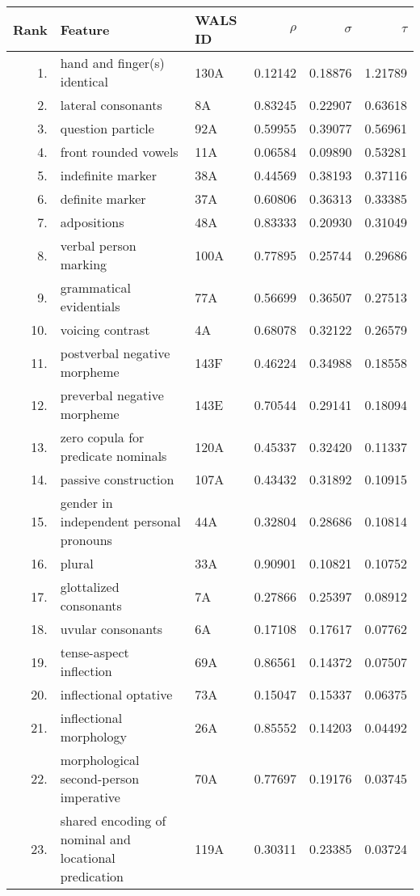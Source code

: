 \begin{tabular}{rllrrr}
Rank & Feature & WALS ID & $\rho$ & $\sigma$ & $\tau$ \\
\hline
1. & hand and finger(s) identical & 130A & 0.12142 & 0.18876 & 1.21789 \\
2. & lateral consonants & 8A & 0.83245 & 0.22907 & 0.63618 \\
3. & question particle & 92A & 0.59955 & 0.39077 & 0.56961 \\
4. & front rounded vowels & 11A & 0.06584 & 0.09890 & 0.53281 \\
5. & indefinite marker & 38A & 0.44569 & 0.38193 & 0.37116 \\
6. & definite marker & 37A & 0.60806 & 0.36313 & 0.33385 \\
7. & adpositions & 48A & 0.83333 & 0.20930 & 0.31049 \\
8. & verbal person marking & 100A & 0.77895 & 0.25744 & 0.29686 \\
9. & grammatical evidentials & 77A & 0.56699 & 0.36507 & 0.27513 \\
10. & voicing contrast & 4A & 0.68078 & 0.32122 & 0.26579 \\
11. & postverbal negative morpheme & 143F & 0.46224 & 0.34988 & 0.18558 \\
12. & preverbal negative morpheme & 143E & 0.70544 & 0.29141 & 0.18094 \\
13. & zero copula for predicate nominals & 120A & 0.45337 & 0.32420 & 0.11337 \\
14. & passive construction & 107A & 0.43432 & 0.31892 & 0.10915 \\
15. & gender in independent personal pronouns & 44A & 0.32804 & 0.28686 & 0.10814 \\
16. & plural & 33A & 0.90901 & 0.10821 & 0.10752 \\
17. & glottalized consonants & 7A & 0.27866 & 0.25397 & 0.08912 \\
18. & uvular consonants & 6A & 0.17108 & 0.17617 & 0.07762 \\
19. & tense-aspect inflection & 69A & 0.86561 & 0.14372 & 0.07507 \\
20. & inflectional optative & 73A & 0.15047 & 0.15337 & 0.06375 \\
21. & inflectional morphology & 26A & 0.85552 & 0.14203 & 0.04492 \\
22. & morphological second-person imperative & 70A & 0.77697 & 0.19176 & 0.03745 \\
23. & shared encoding of nominal and locational predication & 119A & 0.30311 & 0.23385 & 0.03724 \\

\end{tabular}
